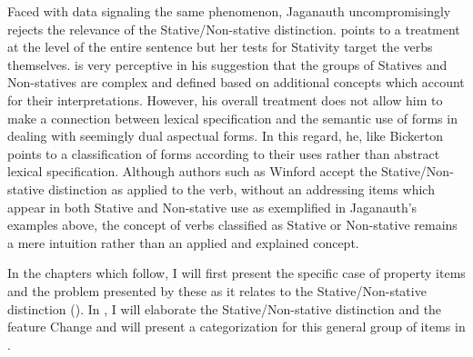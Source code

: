 Faced with data signaling the same phenomenon, Jaganauth
uncompromisingly rejects the relevance of the Stative\slash Non-stative
distinction.  \citet{Gooden2008} points to a treatment at the level of
the entire sentence but her tests for Stativity target the verbs
themselves.  \citet{Sidnell2002} is very perceptive in his suggestion
that the groups of Statives and Non-statives are complex and defined
based on additional concepts which account for their interpretations.
However, his overall treatment does not allow him to make a connection
between lexical specification and the semantic use of forms in dealing
with seemingly dual aspectual forms.  In this regard, he, like
Bickerton points to a classification of forms according to their uses
rather than abstract lexical specification.  Although authors such as
Winford accept the Stative\slash Non-stative distinction as applied to the
verb, without an addressing items which appear in both Stative and
Non-stative use as exemplified in Jaganauth’s examples above, the
concept of verbs classified as Stative or Non-stative remains a mere
intuition rather than an applied and explained concept.

In the chapters which follow, I will first present the specific case
of property items and the problem presented by these as it relates to
the Stative\slash Non-stative distinction ().  In ,
I will elaborate the Stative\slash Non-stative distinction and the feature
Change and will present a categorization for this general group of
items in .

